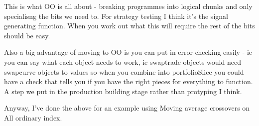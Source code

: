 \documentclass{article}\usepackage{graphicx, color}
\begin{document}
This is what OO is all about - breaking programmes into logical chunks and only specialisng the bits we need to. For strategy testing I think it's the signal generating function. When you work out what this will require the rest of the bits should be easy.

Also a big advantage of moving to OO is you can put in error checking easily - ie you can say what each object needs to work, ie swaptrade objects would need swapcurve objects to values so when you combine into portfolioSlice you could have a check that tells you if you have the right pieces for everything to function. A step we put in the production building stage rather than protyping I think.

Anyway, I've done the above for an example using Moving average crossovers on All ordinary index.
\end{document}

